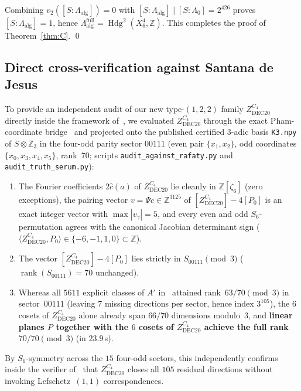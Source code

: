 \documentclass[11pt,a4paper]{amsart}
\theoremstyle{definition}
\newcommand{\ZZ}{\mathbb{Z}}
\newcommand{\Hdg}{\operatorname{Hdg}}
\newcommand{\rank}{\operatorname{rank}}
\begin{document}
Combining $v_2([S : \Lambda_{\mathrm{alg}}]) = 0$ with $[S : \Lambda_{\mathrm{alg}}] \mid [S : \Lambda_0] = 2^{426}$ proves $[S : \Lambda_{\mathrm{alg}}] = 1$, hence $\Lambda_{\mathrm{alg}}^{\mathrm{full}} = \Hdg^2(X_6^4, \ZZ)$. This completes the proof of Theorem~\ref{thm:C}. \qed

\subsection{Direct cross-verification against \texorpdfstring{Santana de Jesus~\cite{SdJ26}}{Santana de Jesus (2026)}}
To provide an independent audit of our new type-$(1,2,2)$ family $Z_{\mathrm{DEC20}}^{C_4}$ directly inside the framework of~\cite{SdJ26}, we evaluated $Z_{\mathrm{DEC20}}^{C_4}$ through the exact Pham-coordinate bridge~\cite[Lemma~2.3]{SdJ26} and projected onto the published certified $3$-adic basis \texttt{K3.npy} of $S \otimes \ZZ_3$ in the four-odd parity sector $00111$ (even pair $\{x_1, x_2\}$, odd coordinates $\{x_0, x_3, x_4, x_5\}$, rank~$70$; scripts \texttt{audit\_against\_rafaty.py} and \texttt{audit\_truth\_serum.py}):
\begin{enumerate}
  \item The Fourier coefficients $2\hat{c}(a)$ of $Z_{\mathrm{DEC20}}^{C_4}$ lie cleanly in $\ZZ[\zeta_6]$ (zero exceptions), the pairing vector $v = \Psi c \in \ZZ^{3125}$ of $[Z_{\mathrm{DEC20}}^{C_4}] - 4[P_0]$ is an exact integer vector with $\max |v_\gamma| = 5$, and every even and odd $S_6$-permutation agrees with the canonical Jacobian determinant sign ($\langle Z_{\mathrm{DEC20}}^{C_4}, P_0 \rangle \in \{-6, -1, 1, 0\} \subset \ZZ$).
  \item The vector $[Z_{\mathrm{DEC20}}^{C_4}] - 4[P_0]$ lies strictly in $S_{00111} \pmod 3$ ($\rank(S_{00111}) = 70$ unchanged).
  \item Whereas all $5611$ explicit classes of $A'$ in~\cite{SdJ26} attained rank~$63/70 \pmod 3$ in sector~$00111$ (leaving $7$ missing directions per sector, hence index $3^{105}$), the $6$ cosets of $Z_{\mathrm{DEC20}}^{C_4}$ alone already span $66/70$ dimensions modulo~$3$, and \textbf{linear planes $P$ together with the $6$ cosets of $Z_{\mathrm{DEC20}}^{C_4}$ achieve the full rank $70/70 \pmod 3$} (in $23.9$\,s).
\end{enumerate}
By $S_6$-symmetry across the $15$ four-odd sectors, this independently confirms inside the verifier of~\cite{SdJ26} that $Z_{\mathrm{DEC20}}^{C_4}$ closes all $105$ residual directions without invoking Lefschetz~$(1,1)$ correspondences.
\end{document}

